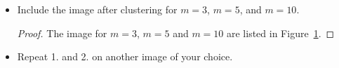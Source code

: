 \documentclass[12pt]{article}
\newcommand{\1}{\mathbf{1}}
\begin{document}
{\begin{itemize}
\begin{proof}
    \begin{figure}[htbp]
    \centering
    \caption{Output for default image with $m=3,5,10$.\label{fig:part2-1}}
    \end{figure}

  \end{proof}
  \item Include the image after clustering for $m=3$, $m=5$, and $m=10$.
  \begin{proof}
    The image for $m=3$, $m=5$ and $m=10$ are listed in Figure~\ref{fig:part2-1}.
  \end{proof}
  \item Repeat 1. and 2. on another image of your choice.


\end{itemize}}
\end{document}
